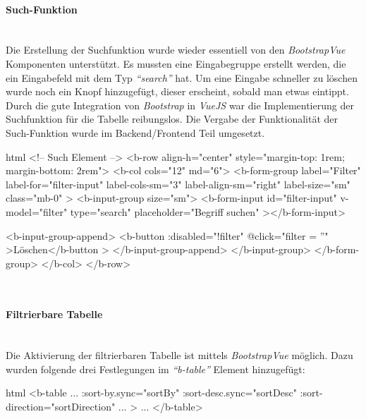 \paragraph{Such-Funktion}
~\\
Die Erstellung der Suchfunktion wurde wieder essentiell von den \textit{BootstrapVue} Komponenten unterstützt. Es mussten eine Eingabegruppe erstellt werden, die ein Eingabefeld mit dem Typ \textit{\enquote{search}} hat. Um eine Eingabe schneller zu löschen wurde noch ein Knopf hinzugefügt, dieser erscheint, sobald man etwas eintippt. Durch die gute Integration von \textit{Bootstrap} in \textit{VueJS} war die Implementierung der Suchfunktion für die Tabelle reibungslos. Die Vergabe der Funktionalität der Such-Funktion wurde im Backend/Frontend Teil umgesetzt.
\begin{code}{html}
	<!-- Such Element -->
    <b-row align-h="center" style="margin-top: 1rem; margin-bottom: 2rem">
      <b-col cols="12" md="6">
        <b-form-group
          label="Filter"
          label-for="filter-input"
          label-cols-sm="3"
          label-align-sm="right"
          label-size="sm"
          class="mb-0"
        >
          <b-input-group size="sm">
            <b-form-input
              id="filter-input"
              v-model="filter"
              type="search"
              placeholder="Begriff suchen"
            ></b-form-input>

            <b-input-group-append>
              <b-button :disabled="!filter" @click="filter = ''"
                >Löschen</b-button
              >
            </b-input-group-append>
          </b-input-group>
        </b-form-group>
      </b-col>
    </b-row>
\end{code}
	\label{list:antragsearchcode} ~\\
\paragraph{Filtrierbare Tabelle}
~\\
Die Aktivierung der filtrierbaren Tabelle ist mittels \textit{BootstrapVue} möglich. Dazu wurden folgende drei Festlegungen im \textit{\enquote{b-table}} Element hinzugefügt:
\begin{code}{html}
	<b-table
		...
		:sort-by.sync="sortBy"
      	:sort-desc.sync="sortDesc"
      	:sort-direction="sortDirection"
		...
	>
	...
	</b-table>
\end{code}
	\label{list:antragfiltercode} ~\\
